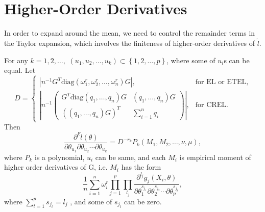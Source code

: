 \section{Higher-Order Derivatives}\label{app:high-order-der}

In order to expand around the mean, we need to control the
remainder terms in the Taylor expansion, which involves the finiteness of higher-order
derivatives of $\tilde{l}$. 
\begin{lemma}
\label{lem:control-higher-order-derivative-2}
For any $k=1,2,\ldots,$ $\left(u_{1},u_{2},\ldots,u_{k}\right)\subset\left\{ 1,2,\ldots,p\right\} $,
where some of $u_{i}$s can be equal. Let 
\[
D=\begin{cases}
\left|n^{-1}G^{T}\mathrm{diag}\left(\omega_{1}^{r},\omega_{2}^{r},\ldots,\omega_{n}^{r}\right)G\right|, & \text{for EL or ETEL,}\\
\left|n^{-1}\left(\begin{array}{cc}
G^{T}\mathrm{diag}\left(q_{1},\ldots,q_{n}\right)G & \left(q_{1},\ldots,q_{n}\right)G\\
\left(\left(q_{1},\ldots,q_{n}\right)G\right)^{T} & \sum_{i=1}^{n}q_{i}
\end{array}\right)\right|, & \text{for CREL.}
\end{cases}
\]
Then 
\[
\frac{\partial^{k}\tilde{l}\left(\theta\right)}{\partial\theta_{u_{1}}\partial\theta_{u_{2}}\cdots\partial\theta_{u_{k}}}=D^{-r_{k}}P_{k}\left(M_{1},M_{2},\ldots,\nu,\mu\right),
\]
where $P_{k}$ is a polynomial, $u_{i}$ can be same, and each $M_{i}$
is empirical moment of higher order derivatives of G, i.e. $M_{i}$
has the form 
\[
\frac{1}{n}\sum_{i=1}^{n}\omega_{i}^{r}\prod_{j=1}^{p}\prod_{l_{j}}\frac{\partial^{l_{j}}g_{j}\left(X_{i},\theta\right)}{\partial\theta_{1}^{s_{j_{1}}}\partial\theta_{2}^{s_{j_{2}}}\cdots\partial\theta_{p}^{s_{j_{p}}}},
\]
where $\sum_{t=1}^{p}s_{j_{t}}=l_{j}$ , and some of $s_{j_{t}}$
can be zero. \end{lemma}
